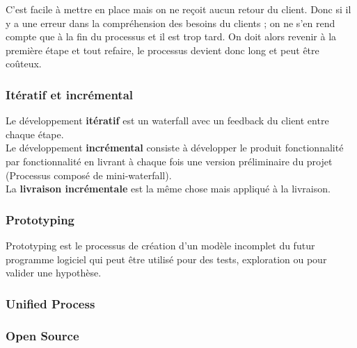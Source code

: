 C'est facile à mettre en place mais on ne reçoit aucun retour du client. Donc si il y a une erreur dans la compréhension des besoins du clients ; on ne s'en rend compte que à la fin du processus et il est trop tard. On doit alors revenir à la première étape et tout refaire, le processus devient donc long et peut être coûteux.



\subsubsection{Itératif et incrémental}
Le développement \textbf{itératif} est un waterfall avec un feedback du client entre chaque étape.
\\Le développement \textbf{incrémental} consiste à développer le produit fonctionnalité par fonctionnalité en livrant à chaque fois une version préliminaire du projet (Processus composé de mini-waterfall).
\\La \textbf{livraison incrémentale} est la même chose mais appliqué à la livraison.



\subsubsection{Prototyping}
Prototyping est le processus de création d'un modèle incomplet du futur programme logiciel qui peut être utilisé pour des tests, exploration ou pour valider une hypothèse.


\subsubsection{Unified Process}



\subsubsection{Open Source}
